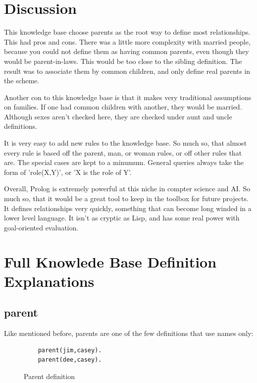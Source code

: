 \documentclass[12pt]{article}
\begin{document}
\section{Discussion}
This knowledge base choose parents as the root way to define most relationships. This had pros and cons.
There was a little more complexity with married people, because you could not define them as having 
common parents, even though they would be parent-in-laws. This would be too close to the sibling 
definition. The result was to associate them by common children, and only define real parents in the scheme.

Another con to this knowledge base is that it makes very traditional assumptions on families. If one had 
common children with another, they would be married. Although sexes aren't checked here, they are checked
under aunt and uncle definitions. 

It is very easy to add new rules to the knowledge base. So much so, that almost every rule is based off the 
parent, man, or woman rules, or off other rules that are. The special cases are kept to a minumum. General queries always take the form of 'role(X,Y)', or 'X is the role of Y'. 

Overall, Prolog is extremely powerful at this niche in compter science and AI. So much so, that it would be a
great tool to keep in the toolbox for future projects. It defines relationships very quickly, something that can
become long winded in a lower level language. It isn't as cryptic as Lisp, and has some real power with 
goal-oriented evaluation.



\section{Full Knowlede Base Definition Explanations}
\subsection{parent}
Like mentioned before, parents are one of the few definitions that use names only:
\begin{figure}[!h]
 \begin{lstlisting}
	parent(jim,casey).
	parent(dee,casey).
 \end{lstlisting}
\caption{Parent definition}
\label{spec}
\end{figure}
\end{document}
